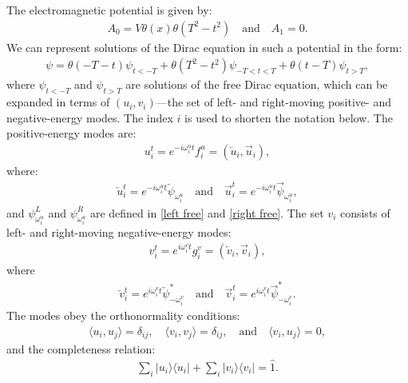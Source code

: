 \documentclass[12pt]{article}
\numberwithin{equation}{section}
\begin{document}
The electromagnetic potential is given by:
\begin{align}
    A_0 = V \theta(x) \theta(T^2 - t^2) \quad \text{and} \quad A_1 = 0.
\end{align}
We can represent solutions of the Dirac equation in such a potential in the form:
\begin{align}
\label{solution}
    \psi = \theta(-T - t) \psi_{t<-T} + \theta(T^2 - t^2) \psi_{-T < t < T} + \theta(t - T) \psi_{t>T},
\end{align}
where $\psi_{t<-T}$ and $\psi_{t>T}$ are solutions of the free Dirac equation, which can be expanded in terms of $(u_i,v_i)$—the set of left- and right-moving positive- and negative-energy modes. The index $i$ is used to shorten the notation below. The positive-energy modes are:
\begin{align}
\label{not1}
    u_i^t = e^{-i \omega_i^u t} f^u_i = ( \overleftarrow{u}_i, \overrightarrow{u}_i),
\end{align}
where:
\begin{align}
    \overleftarrow{u}^t_i = e^{-i \omega^u_i t} \overleftarrow{\psi}_{\omega^u_i} \quad \text{and} \quad \overrightarrow{u}^t_i = e^{-i \omega^u_i t} \overrightarrow{\psi}_{\omega^u_i},
\end{align}
and $\psi_{\omega^u_i}^L$ and $\psi_{\omega^u_i}^R$ are defined in \eqref{left free} and \eqref{right free}. The set $v_i$ consists of left- and right-moving negative-energy modes:
\begin{align}
\label{not2}
    v^t_i = e^{i \omega_i^v t} g^v_i = ( \overleftarrow{v}_i, \overrightarrow{v}_i),
\end{align}
where
\begin{align}
    \overleftarrow{v}^t_i = e^{i \omega^v_i t} \overleftarrow{\psi}^*_{-\omega^v_i} \quad \text{and} \quad \overrightarrow{v}^t_i = e^{i \omega^v_i t} \overrightarrow{\psi}^*_{-\omega^v_i}.
\end{align}
The modes obey the orthonormality conditions:
\begin{align}
    \langle u_i, u_j \rangle = \delta_{ij}, \quad 
    \langle v_i, v_j \rangle = \delta_{ij}, \quad \text{and} \quad 
    \langle v_i, u_j \rangle = 0,
\end{align}
and the completeness relation:
\begin{align}
\sum_i |u_i\rangle\langle u_i| + \sum_i |v_i\rangle\langle v_i| = \hat{1}.
\end{align}
\end{document}
